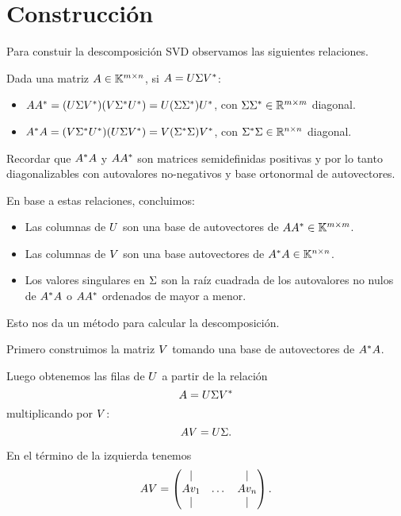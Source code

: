 \section{Construcción}

Para constuir la descomposición SVD observamos las siguientes relaciones.

Dada una matriz $\Ab \in \K^{m \times n}$, si $\Ab = \Ub \Sigmab \Vb^*$:

\begin{itemize}
\item $\Ab \Ab^* = (\Ub \Sigmab \Vb^*) (\Vb \Sigmab^* \Ub^*) = \Ub (\Sigmab \Sigmab^*) \Ub^*$, con $\Sigmab \Sigmab^* \in \R^{m \times m}$ diagonal.
\item $\Ab^* \Ab = (\Vb \Sigmab^* \Ub^*) (\Ub \Sigmab \Vb^*) = \Vb (\Sigmab^* \Sigmab) \Vb^*$, con $\Sigmab^* \Sigmab \in \R^{n \times n}$ diagonal.
\end{itemize}

Recordar que $\Ab^* \Ab$ y $\Ab \Ab^*$ son matrices semidefinidas positivas y por
lo tanto diagonalizables con autovalores no-negativos y base ortonormal
de autovectores.

En base a estas relaciones, concluimos:
\begin{itemize}
\item  Las columnas de $\Ub$ son una base de autovectores de
    $\Ab \Ab^* \in \K^{m \times m}$.

\item Las columnas de $\Vb$ son una base autovectores de
    $\Ab^* \Ab \in \K^{n \times n}$.

\item Los valores singulares en $\Sigmab$ son la raíz cuadrada de los
    autovalores no nulos de $\Ab^* \Ab$ o $\Ab \Ab^*$ ordenados de mayor a menor.
\end{itemize}


Esto nos da un método para calcular la descomposición. 

Primero construimos la matriz $\Vb$ tomando una base de autovectores de $\Ab^* \Ab$.

Luego obtenemos las filas de $\Ub$ a partir de la relación
$$
\Ab = \Ub \Sigmab \Vb^*
$$
multiplicando por $\Vb$:
$$
\Ab \Vb = \Ub \Sigmab.
$$

En el término de la izquierda tenemos
$$
\Ab\Vb = \begin{pmatrix} \vert & & \vert \\ \Ab \vb_1 & \dots & \Ab \vb_n \\ \vert & & \vert \end{pmatrix}.
$$



